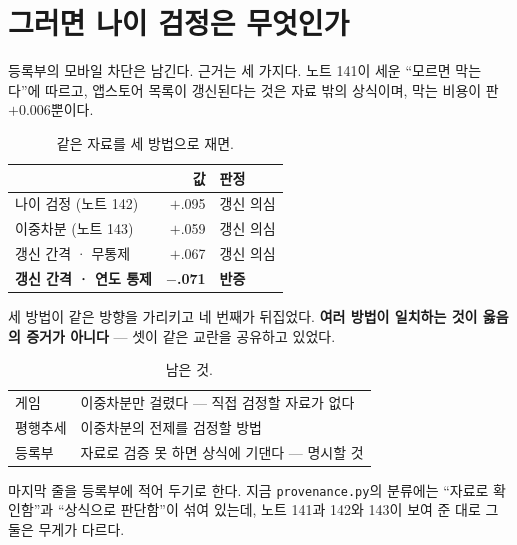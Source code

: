 \documentclass[10pt]{article}
\begin{document}

\section{그러면 나이 검정은 무엇인가}


등록부의 모바일 차단은 남긴다. 근거는 세 가지다. 노트 141이 세운 ``모르면
막는다''에 따르고, 앱스토어 목록이 갱신된다는 것은 자료 밖의 상식이며,
막는 비용이 판 $+$0.006뿐이다.

\begin{table}[t]
\centering\tsize
\caption{같은 자료를 세 방법으로 재면.}
\begin{tabular}{lrl}
\toprule
& 값 & 판정 \\
\midrule
나이 검정 (노트 142) & $+$.095 & 갱신 의심 \\
이중차분 (노트 143) & $+$.059 & 갱신 의심 \\
갱신 간격 · 무통제 & $+$.067 & 갱신 의심 \\
\textbf{갱신 간격 · 연도 통제} & \textbf{$-$.071} & \textbf{반증} \\
\bottomrule
\end{tabular}
\end{table}

세 방법이 같은 방향을 가리키고 네 번째가 뒤집었다. \textbf{여러 방법이
일치하는 것이 옳음의 증거가 아니다} --- 셋이 같은 교란을 공유하고 있었다.

\begin{table}[t]
\centering\tsize
\caption{남은 것.}
\begin{tabular}{ll}
\toprule
게임 & 이중차분만 걸렸다 --- 직접 검정할 자료가 없다 \\
평행추세 & 이중차분의 전제를 검정할 방법 \\
등록부 & 자료로 검증 못 하면 상식에 기댄다 --- 명시할 것 \\
\bottomrule
\end{tabular}
\end{table}

마지막 줄을 등록부에 적어 두기로 한다. 지금 \texttt{provenance.py}의
분류에는 ``자료로 확인함''과 ``상식으로 판단함''이 섞여 있는데, 노트 141과
142와 143이 보여 준 대로 그 둘은 무게가 다르다.
\end{document}
